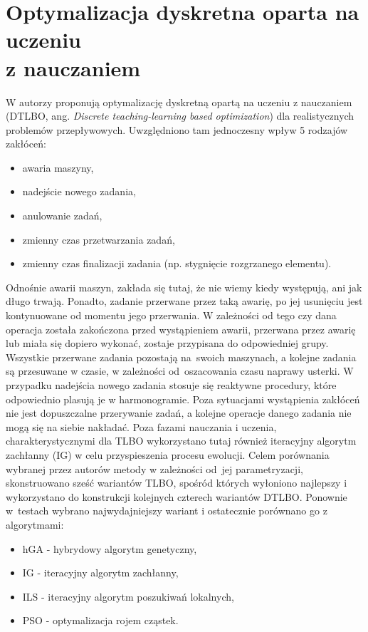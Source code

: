 \documentclass[printmode,oneside]{mgr}
\begin{document}
\section[Optymalizacja dyskretna oparta na uczeniu z nauczaniem]{Optymalizacja dyskretna oparta na uczeniu\\ z nauczaniem}
W \cite{DTLBO} autorzy proponują optymalizację dyskretną opartą na uczeniu z nauczaniem (\mbox{DTLBO}, ang. \emph{Discrete teaching-learning based optimization}) dla realistycznych problemów przepływowych. Uwzględniono tam jednoczesny wpływ 5 rodzajów zakłóceń:
\begin{itemize}
    \item awaria maszyny,
    \item nadejście nowego zadania,
    \item anulowanie zadań,
    \item zmienny czas przetwarzania zadań,
    \item zmienny czas finalizacji zadania (np. stygnięcie rozgrzanego elementu).
\end{itemize}
Odnośnie awarii maszyn, zakłada się tutaj, że nie wiemy kiedy występują, ani jak długo trwają. Ponadto, zadanie przerwane przez taką awarię, po jej usunięciu jest kontynuowane od momentu jego przerwania. W zależności od tego czy dana operacja została zakończona przed wystąpieniem awarii, przerwana przez awarię lub miała się dopiero wykonać, zostaje przypisana do odpowiedniej grupy. Wszystkie przerwane zadania pozostają na~swoich maszynach, a  kolejne zadania są przesuwane w czasie, w zależności od~oszacowania czasu naprawy usterki. W przypadku nadejścia nowego zadania stosuje się reaktywne procedury, które odpowiednio plasują je w harmonogramie. Poza sytuacjami wystąpienia zakłóceń nie jest dopuszczalne przerywanie zadań, a kolejne operacje danego zadania nie mogą się na siebie nakładać. Poza fazami nauczania i uczenia, charakterystycznymi dla TLBO wykorzystano tutaj również iteracyjny algorytm zachłanny (IG) w celu przyspieszenia procesu ewolucji. Celem porównania wybranej przez autorów metody w zależności od~jej parametryzacji, skonstruowano sześć wariantów TLBO, spośród których wyłoniono najlepszy i wykorzystano do konstrukcji kolejnych czterech wariantów DTLBO. Ponownie w~testach wybrano najwydajniejszy wariant i ostatecznie porównano go z algorytmami:
\begin{itemize}
    \item hGA - hybrydowy algorytm genetyczny,
    \item IG - iteracyjny algorytm zachłanny,
    \item ILS - iteracyjny algorytm poszukiwań lokalnych,
    \item PSO - optymalizacja rojem cząstek.
\end{itemize}
\end{document}
